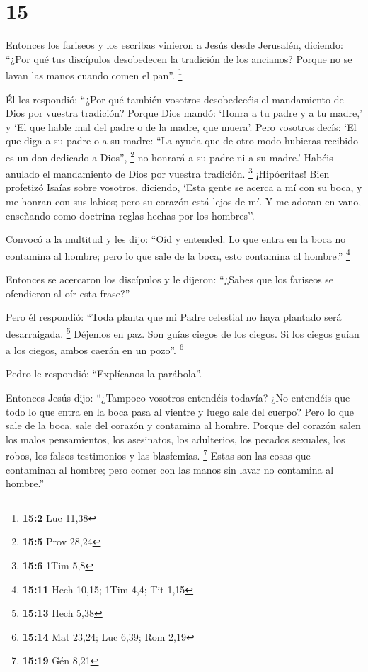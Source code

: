 \hypertarget{section-14}{%
\section{15}\label{section-14}}

 Entonces los fariseos y los escribas vinieron a Jesús
desde Jerusalén, diciendo:  ``¿Por qué tus discípulos
desobedecen la tradición de los ancianos? Porque no se lavan las manos
cuando comen el pan''. \footnote{\textbf{15:2} Luc 11,38}

 Él les respondió: ``¿Por qué también vosotros
desobedecéis el mandamiento de Dios por vuestra tradición?
 Porque Dios mandó: `Honra a tu padre y a tu madre,' y `El
que hable mal del padre o de la madre, que muera'.  Pero
vosotros decís: `El que diga a su padre o a su madre: ``La ayuda que de
otro modo hubieras recibido es un don dedicado a Dios'', \footnote{\textbf{15:5}
  Prov 28,24}  no honrará a su padre ni a su madre.'
Habéis anulado el mandamiento de Dios por vuestra tradición. \footnote{\textbf{15:6}
  1Tim 5,8}  ¡Hipócritas! Bien profetizó Isaías sobre
vosotros, diciendo,  `Esta gente se acerca a mí con su
boca, y me honran con sus labios; pero su corazón está lejos de mí.
 Y me adoran en vano, enseñando como doctrina reglas
hechas por los hombres''.

 Convocó a la multitud y les dijo: ``Oíd y entended.
 Lo que entra en la boca no contamina al hombre; pero lo
que sale de la boca, esto contamina al hombre.'' \footnote{\textbf{15:11}
  Hech 10,15; 1Tim 4,4; Tit 1,15}

 Entonces se acercaron los discípulos y le dijeron:
``¿Sabes que los fariseos se ofendieron al oír esta frase?''

 Pero él respondió: ``Toda planta que mi Padre celestial
no haya plantado será desarraigada. \footnote{\textbf{15:13} Hech 5,38}
 Déjenlos en paz. Son guías ciegos de los ciegos. Si los
ciegos guían a los ciegos, ambos caerán en un pozo''. \footnote{\textbf{15:14}
  Mat 23,24; Luc 6,39; Rom 2,19}

 Pedro le respondió: ``Explícanos la parábola''.

 Entonces Jesús dijo: ``¿Tampoco vosotros entendéis
todavía?  ¿No entendéis que todo lo que entra en la boca
pasa al vientre y luego sale del cuerpo?  Pero lo que
sale de la boca, sale del corazón y contamina al hombre. 
Porque del corazón salen los malos pensamientos, los asesinatos, los
adulterios, los pecados sexuales, los robos, los falsos testimonios y
las blasfemias. \footnote{\textbf{15:19} Gén 8,21}  Estas
son las cosas que contaminan al hombre; pero comer con las manos sin
lavar no contamina al hombre.''


